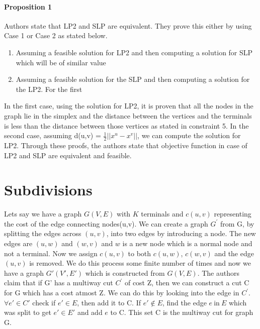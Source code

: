 \documentclass[11pt]{article}
\begin{document}
  \paragraph{Proposition 1} Authors state that LP2 and SLP are equivalent. They prove this either by using Case 1 or Case 2 as stated below.  
  \begin{enumerate} \itemsep -3pt
  \item   Assuming a feasible solution for LP2 and then computing a solution for SLP which will be of similar value
  \item Assuming a feasible solution for the SLP and then computing a solution for the LP2. For the first
  \end{enumerate}
In the first case, using the solution for LP2, it is proven that all the nodes in the graph lie in the simplex and the distance between the vertices and the terminals is less than the distance between those vertices as stated in constraint 5. In the second case, assuming d(u,v) = $\frac{1}{2} \vert \vert x^{u} - x^{v} \vert \vert$, we can compute the solution for LP2. Through these proofs, the authors state that objective function in case of LP2 and SLP are equivalent and feasible.
  
\section{Subdivisions}
Lets say we have a graph $G(V,E)$ with $K$ terminals and $c(u,v)$ representing the cost of the edge connecting nodes(u,v). We can create a graph $G^{'}$ from G, by splitting the edges across $(u,v)$, into two edges by introducing a node. The new edges are $(u,w)$ and $(w,v)$ and $w$ is a new node which is a normal node and not a terminal. Now we assign $c(u,v)$ to both $c(u,w)$, $c(w,v)$ and the edge $(u,v)$ is removed. We do this process some finite number of times and now we have a graph $G'(V',E')$  which is constructed from $G(V,E)$. The authors claim that if G' has a multiway cut $C^{'}$ of cost Z, then we can construct a cut C for G which has a cost atmost Z. We can do this by looking into the edge in $C^{'}$. $\forall e' \in C'$ check if $e' \in E$, then add it to C. If $e' \notin E$, find the edge $e \ \text{in} \ E$ which was split to get $e' \in E'$ and add $e$ to C. This set C is the multiway cut for graph G.
\end{document}

